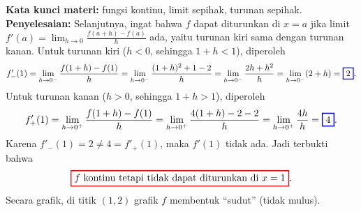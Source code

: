 \documentclass[10pt,openany,a4paper]{article}
\theoremstyle{definition}
\theoremstyle{definition}
\theoremstyle{plain}
\newenvironment{jawab}[2][tes]{%
\par\noindent\textbf{Kata kunci materi:} #1.\\
\textbf{Penyelesaian:} #2%
}{}
\begin{document}
\begin{enumerate}
\begin{jawab}[fungsi kontinu, limit sepihak, turunan sepihak]
{        Selanjutnya, ingat bahwa $f$ dapat diturunkan di $x=a$ jika limit $\displaystyle f'(a)=\lim_{h\to 0}\frac{f(a+h)-f(a)}{h}$ ada, yaitu turunan kiri sama dengan turunan kanan. Untuk turunan kiri ($h<0$, sehingga $1+h<1$), diperoleh
        \begin{align*}
            f'_-(1) = \lim_{h\to 0^-}\frac{f(1+h)-f(1)}{h} = \lim_{h\to 0^-}\frac{(1+h)^2+1-2}{h} = \lim_{h\to 0^-}\frac{2h+h^2}{h} = \lim_{h\to 0^-}(2+h) = \colorlet{oldcolor}{.}
        \color{blue}
        \setlength{\fboxrule}{1pt} \boxed{\color{oldcolor}2}\color{oldcolor}.
        \end{align*}
        Untuk turunan kanan ($h>0$, sehingga $1+h>1$), diperoleh
        \begin{align*}
            f'_+(1) = \lim_{h\to 0^+}\frac{f(1+h)-f(1)}{h} = \lim_{h\to 0^+}\frac{4(1+h)-2-2}{h} = \lim_{h\to 0^+}\frac{4h}{h} = \colorlet{oldcolor}{.}
        \color{blue}
        \setlength{\fboxrule}{1pt} \boxed{\color{oldcolor}4}\color{oldcolor}.
        \end{align*}
        Karena $f'_-(1)=2\neq 4=f'_+(1)$, maka $f'(1)$ tidak ada. Jadi terbukti bahwa
        \[\colorlet{oldcolor}{.}
        \color{red}
        \setlength{\fboxrule}{1pt} \boxed{\color{oldcolor}f \text{ kontinu tetapi tidak dapat diturunkan di } x=1}\color{oldcolor}.\]
        Secara grafik, di titik $(1,2)$ grafik $f$ membentuk ``sudut'' (tidak mulus).
    }
    \end{jawab}


\end{enumerate}
\end{document}
